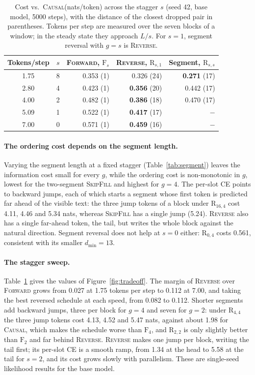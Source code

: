 \documentclass{article}
\theoremstyle{definition}
\theoremstyle{remark}
\newcommand{\name}[1]{\textup{\textsc{#1}}}
\newcommand{\sfill}{\name{SkipFill}\xspace}
\newcommand{\rev}{\name{Reverse}\xspace}
\newcommand{\fwd}{\name{Forward}\xspace}
\newcommand{\causal}{\name{Causal}\xspace}
\newcommand{\Rsg}[2]{\mathrm{R}_{#1,#2}}
\newcommand{\Fs}[1]{\mathrm{F}_{#1}}
\newcommand{\dmin}{d_{\min}}
\begin{document}
\begin{table}[t]
  \centering
  \caption{Cost vs.\ \causal (nats/token) across the stagger $s$ (seed 42, base model, 5000 steps), with the distance of the closest dropped pair in parentheses. Tokens per step are measured over the seven blocks of a window; in the steady state they approach $L/s$. For $s=1$, segment reversal with $g=s$ is \rev.}
  \label{tab:tradeoff}
  \small
  \begin{tabular}{crrrr}
    \toprule
    Tokens/step & $s$ & \fwd, $\Fs{s}$ & \rev, $\Rsg{s}{1}$ & Segment, $\Rsg{s}{s}$ \\
    \midrule
    1.75 & 8 & 0.353 (1) & 0.326 (24) & \textbf{0.271} (17) \\
    2.80 & 4 & 0.423 (1) & \textbf{0.356} (20) & 0.442 (17) \\
    4.00 & 2 & 0.482 (1) & \textbf{0.386} (18) & 0.470 (17) \\
    5.09 & 1 & 0.522 (1) & \textbf{0.417} (17) & $-$ \\
    7.00 & 0 & 0.571 (1) & \textbf{0.459} (16) & $-$ \\
    \bottomrule
  \end{tabular}
\end{table}

\paragraph{The ordering cost depends on the segment length.}
Varying the segment length at a fixed stagger (Table~\ref{tab:segment}) leaves the information cost small for every $g$, while the ordering cost is non-monotonic in $g$, lowest for the two-segment \sfill and highest for $g=4$.
The per-slot CE points to backward jumps, each of which starts a segment whose first token is predicted far ahead of the visible text: the three jump tokens of a block under $\Rsg{16}{4}$ cost 4.11, 4.46 and 5.34 nats, whereas \sfill has a single jump (5.24).
\rev also has a single far-ahead token, the tail, but writes the whole block against the natural direction.
Segment reversal does not help at $s=0$ either: $\Rsg{0}{4}$ costs 0.561, consistent with its smaller $\dmin=13$.

\paragraph{The stagger sweep.}
Table~\ref{tab:tradeoff} gives the values of Figure~\ref{fig:tradeoff}.
The margin of \rev over \fwd grows from 0.027 at 1.75 tokens per step to 0.112 at 7.00, and taking the best reversed schedule at each speed, from 0.082 to 0.112.
Shorter segments add backward jumps, three per block for $g=4$ and seven for $g=2$: under $\Rsg{4}{4}$ the three jump tokens cost 4.13, 4.52 and 5.47 nats, against about 1.98 for \causal, which makes the schedule worse than $\Fs{4}$, and $\Rsg{2}{2}$ is only slightly better than $\Fs{2}$ and far behind \rev.
\rev makes one jump per block, writing the tail first; its per-slot CE is a smooth ramp, from 1.34 at the head to 5.58 at the tail for $s=2$, and its cost grows slowly with parallelism.
These are single-seed likelihood results for the base model.
\end{document}

